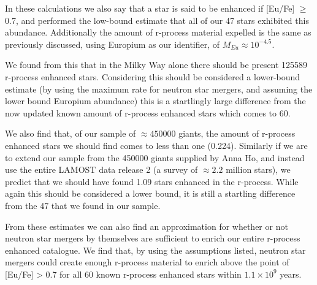\documentclass[a4paper,fleqn,usenatbib]{mnras}
\begin{document}
	In these calculations we also say that a star is said to be enhanced if [Eu/Fe] $\geq$ 0.7, and performed the low-bound estimate that all of our 47 stars exhibited this abundance. Additionally the amount of r-process material expelled is the same as previously discussed, using Europium as our identifier, of $M_{Eu}\approx10^{-4.5}$.
	
    We found from this that in the Milky Way alone there should be present 125589 r-process enhanced stars. Considering this should be considered a lower-bound estimate (by using the maximum rate for neutron star mergers, and assuming the lower bound Europium abundance) this is a startlingly large difference from the now updated known amount of r-process enhanced stars which comes to 60. 
    
    We also find that, of our sample of $\approx450000$ giants, the amount of r-process enhanced stars we should find comes to less than one (0.224). Similarly if we are to extend our sample from the 450000 giants supplied by Anna Ho, and instead use the entire LAMOST data release 2 (a survey of $\approx2.2$ million stars), we predict that we should have found 1.09 stars enhanced in the r-process. While again this should be considered a lower bound, it is still a startling difference from the 47 that we found in our sample.
    
    From these estimates we can also find an approximation for whether or not neutron star mergers by themselves are sufficient to enrich our entire r-process enhanced catalogue. We find that, by using the assumptions listed, neutron star mergers could create enough r-process material to enrich above the point of [Eu/Fe] > 0.7 for all 60 known r-process enhanced stars within $1.1\times10^9$ years. 
    
    
	
\end{document}
